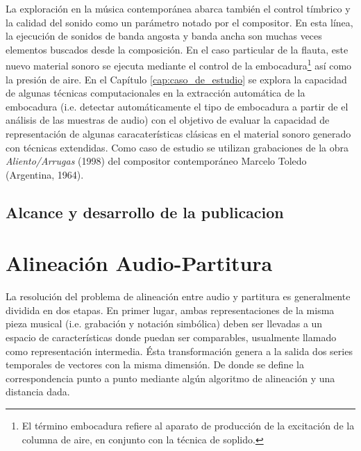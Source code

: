 \documentclass
  [ams,pdfout]%
	{aeslac}
\begin{document}
La exploración en la música contemporánea abarca también el control tímbrico y la calidad del sonido como un parámetro notado por el compositor. En esta línea, la ejecución de sonidos de banda angosta y banda ancha son muchas veces elementos buscados desde la composición. En el caso particular de la flauta, este nuevo material sonoro se ejecuta mediante el control de la embocadura\footnote{El término embocadura refiere al aparato de producción de la excitación de la columna de aire, en conjunto con la técnica de soplido.} así como la presión de aire. En el Capítulo \ref{cap:caso_de_estudio} se explora la capacidad de algunas técnicas computacionales en la extracción automática de la embocadura (i.e. detectar automáticamente el tipo de embocadura a partir de el análisis de las muestras de audio) con el objetivo de evaluar la capacidad de representación de algunas caracaterísticas clásicas en el material sonoro generado con técnicas extendidas. Como caso de estudio se utilizan grabaciones de la obra \textit{Aliento/Arrugas} (1998) del compositor contemporáneo Marcelo Toledo (Argentina, 1964). 

\subsection{Alcance y desarrollo de la publicacion}
%
\section{Alineación Audio-Partitura}

La resolución del problema de alineación entre audio y partitura es generalmente dividida en dos etapas. En primer lugar, ambas representaciones de la misma pieza musical (i.e. grabación y notación simbólica) deben ser llevadas a un espacio de características donde puedan ser comparables, usualmente llamado como representación intermedia. Ésta transformación genera a la salida dos series temporales de vectores con la misma dimensión. De donde se define la correspondencia punto a punto mediante algún algoritmo de alineación y una distancia dada.
\end{document}
